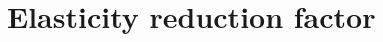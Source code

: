 \section{Elasticity reduction factor}\label{sec:exp-reduction-factor}
\newlength{\imagewidth} 
\setlength{\imagewidth}{0.5\textwidth}










